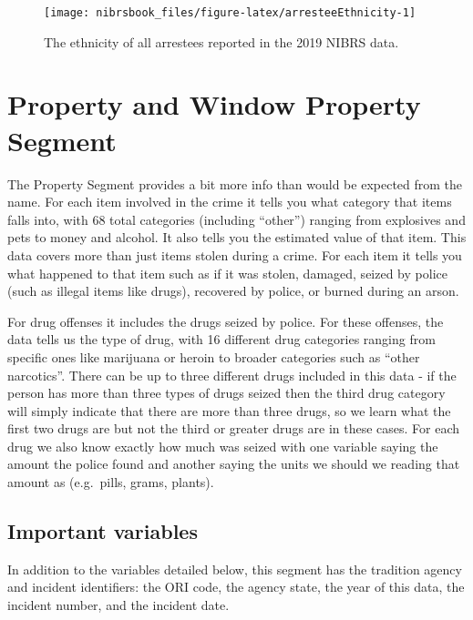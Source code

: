 \documentclass[
  12pt,
  openany]{book}
\begin{document}
\begin{figure}

{\centering \texttt{[image: nibrsbook\_files/figure-latex/arresteeEthnicity-1]} 

}

\caption{The ethnicity of all arrestees reported in the 2019 NIBRS data.}\label{fig:arresteeEthnicity}
\end{figure}

\hypertarget{property-and-window-property-segment}{%
\chapter{Property and Window Property Segment}\label{property-and-window-property-segment}}

The Property Segment provides a bit more info than would be expected from the name. For each item involved in the crime it tells you what category that items falls into, with 68 total categories (including ``other'') ranging from explosives and pets to money and alcohol. It also tells you the estimated value of that item. This data covers more than just items stolen during a crime. For each item it tells you what happened to that item such as if it was stolen, damaged, seized by police (such as illegal items like drugs), recovered by police, or burned during an arson.

For drug offenses it includes the drugs seized by police. For these offenses, the data tells us the type of drug, with 16 different drug categories ranging from specific ones like marijuana or heroin to broader categories such as ``other narcotics''. There can be up to three different drugs included in this data - if the person has more than three types of drugs seized then the third drug category will simply indicate that there are more than three drugs, so we learn what the first two drugs are but not the third or greater drugs are in these cases. For each drug we also know exactly how much was seized with one variable saying the amount the police found and another saying the units we should we reading that amount as (e.g.~pills, grams, plants).

\hypertarget{important-variables-5}{%
\section{Important variables}\label{important-variables-5}}

In addition to the variables detailed below, this segment has the tradition agency and incident identifiers: the ORI code, the agency state, the year of this data, the incident number, and the incident date.
\end{document}
